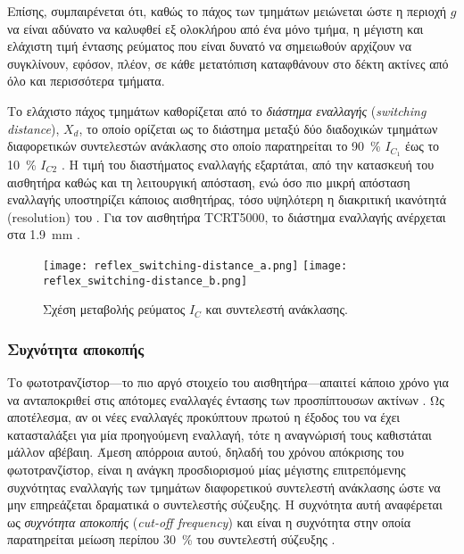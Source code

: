 Επίσης, συμπαιρένεται ότι, καθώς το πάχος των τμημάτων μειώνεται ώστε η περιοχή
$g$ να είναι αδύνατο να καλυφθεί εξ ολοκλήρου από ένα μόνο τμήμα, η μέγιστη και
ελάχιστη τιμή έντασης ρεύματος που είναι δυνατό να σημειωθούν αρχίζουν να
συγκλίνουν, εφόσον, πλέον, σε κάθε μετατόπιση καταφθάνουν στο δέκτη ακτίνες από
όλο και περισσότερα τμήματα.

Το ελάχιστο πάχος τμημάτων καθορίζεται από το
\emph{διάστημα εναλλαγής} (\emph{switching distance}),
$X_d$, το οποίο ορίζεται ως το διάστημα μεταξύ δύο διαδοχικών τμημάτων
διαφορετικών συντελεστών ανάκλασης στο οποίο παρατηρείται το 90~\% $I_{C_1}$ έως
το 10~\% $I_{C2}$ \parencite{vishay06}. Η τιμή του διαστήματος εναλλαγής
εξαρτάται, από την κατασκευή του αισθητήρα καθώς και τη λειτουργική απόσταση,
ενώ όσο πιο μικρή απόσταση εναλλαγής υποστηρίζει κάποιος αισθητήρας, τόσο
υψηλότερη η διακριτική ικανότητά (resolution) του
\parencites{vishay02}{vishay06}. Για τον αισθητήρα TCRT5000, το διάστημα
εναλλαγής ανέρχεται στα 1.9~mm \parencite{vishay02}.

\begin{figure}
    \caption{Σχέση μεταβολής ρεύματος $I_C$ και συντελεστή ανάκλασης.
    \label{fig:reflex:switching-distance}}
    \begin{center}%
    \texttt{[image: reflex\_switching-distance\_a.png]}%
    \texttt{[image: reflex\_switching-distance\_b.png]}%
    \end{center}

\end{figure}

\subsubsection{Συχνότητα αποκοπής}

Το φωτοτρανζίστορ---το πιο αργό στοιχείο του αισθητήρα---απαιτεί κάποιο χρόνο
για να ανταποκριθεί στις απότομες εναλλαγές έντασης των προσπίπτουσων ακτίνων
\parencite{vishay06}. Ως αποτέλεσμα, αν οι νέες εναλλαγές προκύπτουν πρωτού η
έξοδος του να έχει κατασταλάξει για μία προηγούμενη εναλλαγή, τότε η αναγνώρισή
τους καθιστάται μάλλον αβέβαιη. Άμεση απόρροια αυτού, δηλαδή του χρόνου
απόκρισης του φωτοτρανζίστορ, είναι η ανάγκη προσδιορισμού μίας μέγιστης
επιτρεπόμενης συχνότητας εναλλαγής των τμημάτων διαφορετικού συντελεστή
ανάκλασης ώστε να μην επηρεάζεται δραματικά ο συντελεστής σύζευξης. Η συχνότητα
αυτή αναφέρεται ως \emph{συχνότητα αποκοπής} 
(\emph{cut-off frequency}) και είναι η συχνότητα στην οποία παρατηρείται μείωση
περίπου 30~\% του συντελεστή σύζευξης \parencite{vishay02}.

